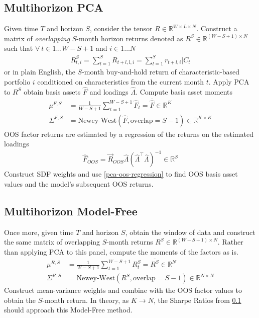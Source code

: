 \documentclass{article}
\newcommand{\R}{{\mathbb R}}
\begin{document}
\subsection{Multihorizon PCA} \label{multiperiod-pca}

Given time $T$ and horizon $S$, consider the tensor $R \in \R^{W \times L \times N}$. 
Construct a matrix of \emph{overlapping} $S$-month horizon returns denoted as $R^S \in \R^{(W-S+1) \times N}$ such that $\forall \ t \in 1 \ldots W - S + 1$ and 
$i \in 1 \ldots N$
\begin{align}
    R^S_{t, i} = \sum_{l=1}^S R_{t+l, l, i} = \sum_{l=1}^S r_{t+l, i} | C_t
\end{align}
or in plain English, the $S$-month buy-and-hold return of characteristic-based portfolio $i$ 
conditioned on characteristics from the current month $t$. Apply PCA to $R^S$ obtain 
basis assets $\widehat{F}$ and loadings $\widehat{\Lambda}$. Compute basis asset moments 
\begin{align*}
    \mu^{F, S} &= \frac{1}{W-S+1} \sum_{t=1}^{W-S+1} \widehat{F}_t = \overline{\widehat{F}} \in \R^{K}\\
    \Sigma^{F, S} &= \text{Newey-West}(\widehat{F}, \text{overlap}=S-1) \in \R^{K \times K}
\end{align*}
OOS factor returns are estimated by a regression of the returns on the estimated loadings 
\begin{align}
    \widehat{F}_{OOS} = \overrightarrow{R}_{OOS} \widehat{\Lambda} \left( \widehat{\Lambda}^\top \widehat{\Lambda}\right)^{-1} \in \R^{S} \label{pca-oos-regression}
\end{align}
Construct SDF weights and use \ref{pca-oos-regression} to find OOS basis asset values and the model's 
subsequent OOS returns.

\subsection{Multihorizon Model-Free}

Once more, given time $T$ and horizon $S$, obtain the window of data and construct the same matrix of overlapping 
$S$-month returns $R^S \in \R^{(W-S+1) \times N}$. Rather than applying PCA to this panel, 
compute the moments of the factors as is. 
\begin{align*}
    \mu^{R, S} &= \frac{1}{W-S+1} \sum_{t=1}^{W-S+1} R^S_t = \overline{R^S} \in \R^{N}\\
    \Sigma^{R, S} &= \text{Newey-West}(R^S, \text{overlap}=S-1) \in \R^{N \times N}
\end{align*}
Construct mean-variance weights and combine with the OOS factor values to obtain the $S$-month return. 
In theory, as $K \to N$, the Sharpe Ratios from \ref{multiperiod-pca} should approach this Model-Free method.
\end{document}
